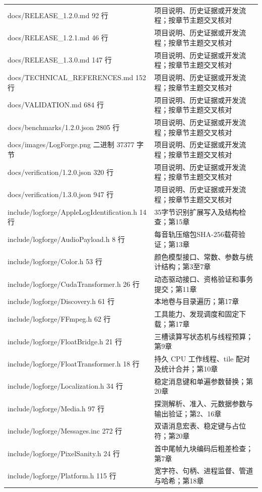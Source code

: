 \documentclass[UTF8,zihao=-4,openany]{ctexbook}
\begin{document}
\begin{longtable}{p{.43\linewidth}p{.47\linewidth}}
docs/RELEASE\_1.2.0.md
92 行 & 项目说明、历史证据或开发流程；按章节主题交叉核对\\
docs/RELEASE\_1.2.1.md
46 行 & 项目说明、历史证据或开发流程；按章节主题交叉核对\\
docs/RELEASE\_1.3.0.md
147 行 & 项目说明、历史证据或开发流程；按章节主题交叉核对\\
docs/TECHNICAL\_REFERENCES.md
152 行 & 项目说明、历史证据或开发流程；按章节主题交叉核对\\
docs/VALIDATION.md
684 行 & 项目说明、历史证据或开发流程；按章节主题交叉核对\\
docs/benchmarks/1.2.0.json
2805 行 & 项目说明、历史证据或开发流程；按章节主题交叉核对\\
docs/images/LogForge.png
二进制 37377 字节 & 项目说明、历史证据或开发流程；按章节主题交叉核对\\
docs/verification/1.2.0.json
320 行 & 项目说明、历史证据或开发流程；按章节主题交叉核对\\
docs/verification/1.3.0.json
947 行 & 项目说明、历史证据或开发流程；按章节主题交叉核对\\
include/logforge/AppleLogIdentification.h
14 行 & 35字节识别扩展写入及结构检查；第15章\\
include/logforge/AudioPayload.h
8 行 & 每音轨压缩包SHA-256载荷验证；第13章\\
include/logforge/Color.h
53 行 & 颜色模型接口、常数、参数与统计结构；第3至7章\\
include/logforge/CudaTransformer.h
26 行 & 动态驱动接口、资格验证和事务提交；第11章\\
include/logforge/Discovery.h
61 行 & 本地卷与目录遍历；第17章\\
include/logforge/FFmpeg.h
62 行 & 工具能力、发现调度和固定下载；第17章\\
include/logforge/FloatBridge.h
21 行 & 三槽读算写状态机与线程预算；第9章\\
include/logforge/FloatTransformer.h
18 行 & 持久 CPU 工作线程、tile 配对及统计合并；第10章\\
include/logforge/Localization.h
34 行 & 稳定消息键和单遍参数替换；第20章\\
include/logforge/Media.h
97 行 & 探测解析、准入、元数据参数与输出验证；第2、16章\\
include/logforge/Messages.inc
272 行 & 双语消息宏表、稳定键与占位符；第20章\\
include/logforge/PixelSanity.h
24 行 & 首中尾帧九块编码后粗差检查；第7章\\
include/logforge/Platform.h
115 行 & 宽字符、句柄、进程监督、管道与哈希；第18章\\

\end{longtable}
\end{document}
